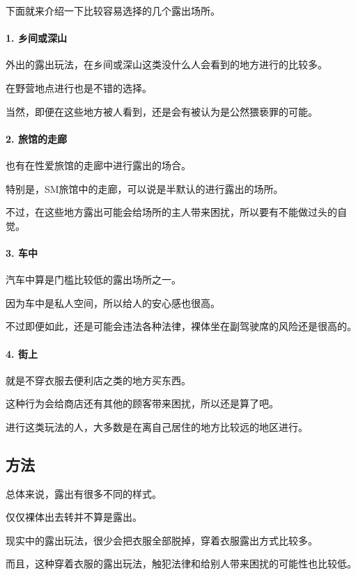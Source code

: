 \documentclass[12pt,UTF8]{ctexbook}
\begin{document}
下面就来介绍一下比较容易选择的几个露出场所。

\paragraph{1. 乡间或深山}

外出的露出玩法，在乡间或深山这类没什么人会看到的地方进行的比较多。

在野营地点进行也是不错的选择。

当然，即便在这些地方被人看到，还是会有被认为是公然猥亵罪的可能。

\paragraph{2. 旅馆的走廊}

也有在性爱旅馆的走廊中进行露出的场合。

特别是，SM旅馆中的走廊，可以说是半默认的进行露出的场所。

不过，在这些地方露出可能会给场所的主人带来困扰，所以要有不能做过头的自觉。

\paragraph{3. 车中}

汽车中算是门槛比较低的露出场所之一。

因为车中是私人空间，所以给人的安心感也很高。

不过即便如此，还是可能会违法各种法律，裸体坐在副驾驶席的风险还是很高的。

\paragraph{4. 街上}

就是不穿衣服去便利店之类的地方买东西。

这种行为会给商店还有其他的顾客带来困扰，所以还是算了吧。

进行这类玩法的人，大多数是在离自己居住的地方比较远的地区进行。

\subsection{方法}

总体来说，露出有很多不同的样式。

仅仅裸体出去转并不算是露出。

现实中的露出玩法，很少会把衣服全部脱掉，穿着衣服露出方式比较多。

而且，这种穿着衣服的露出玩法，触犯法律和给别人带来困扰的可能性也比较低。
\end{document}
